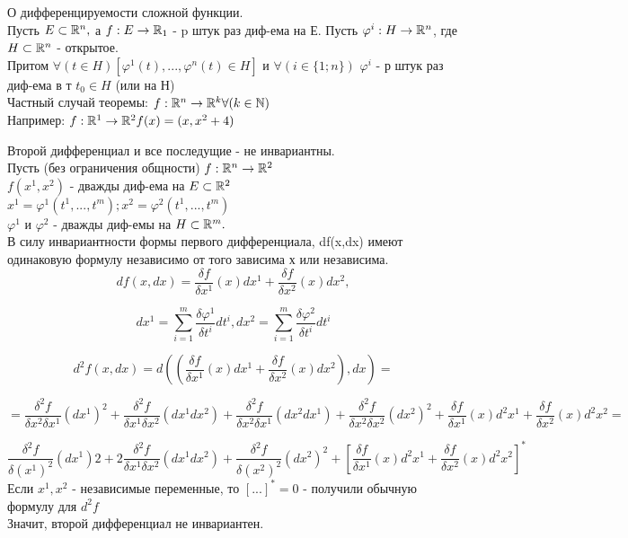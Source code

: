 \begin{teorema}
О дифференцируемости сложной функции.
\\
Пусть $E\subset\mathbb{R}^n,$ а $f:E\to\mathbb{R}_1$ - p штук раз диф-ема на Е. Пусть $\varphi^i:H\to\mathbb{R}^n$, где $H\subset\mathbb{R}^n$ - открытое.
\\
Притом $\forall(t\in H)[\varphi^1(t),...,\varphi^n(t)\in H]$ и $\forall(i\in\{1;n\})$ $\varphi^i$ - р штук раз диф-ема в т $t_0\in H$ (или на Н)
\\
Частный случай теоремы: $f:\mathbb{R}^n\to\mathbb{R}^k \forall(k\in\mathbb{N})$
\\
Например: $f:\mathbb{R}^1\to\mathbb{R}^2  f(x)=(x,x^2+4)$
\end{teorema}
\dokvo
Второй дифференциал и все последущие - не инвариантны.
\\
Пусть (без ограничения общности) $f:\mathbb{R}^n\to\mathbb{R}^2$
\\
$f(x^1,x^2)$ - дважды диф-ема на $E\subset\mathbb{R}^2$
\\
$x^1=\varphi^1(t^1,...,t^m); x^2=\varphi^2(t^1,...,t^m)$
\\
$\varphi^1$ и $\varphi^2$ - дважды диф-емы на $H\subset\mathbb{R}^m.$
\\
В силу инвариантности формы первого дифференциала, df(x,dx) имеют одинаковую формулу независимо от того зависима х или независима.
$$
df(x,dx)=\frac{\delta f}{\delta x^1}(x)dx^1+\frac{\delta f}{\delta x^2}(x)dx^2,
$$

$$
dx^1 = \sum_{i=1}^{m}\frac{\delta\varphi^1}{\delta t^i}dt^i, dx^2 = \sum_{i=1}^{m}\frac{\delta\varphi^2}{\delta t^i}dt^i
$$

$$
d^2 f(x,dx) = d((\frac{\delta f}{\delta x^1}(x)dx^1+\frac{\delta f}{\delta x^2}(x)dx^2),dx)=
$$

$$
=\frac{\delta^2 f}{\delta x^2 \delta x^1}(dx^1)^2+\frac{\delta^2 f}{\delta x^1 \delta x^2}(dx^1 dx^2)+\frac{\delta^2 f}{\delta x^2 \delta x^1}(dx^2 dx^1)+\frac{\delta^2 f}{\delta x^2 \delta x^2}(dx^2)^2+\frac{\delta f}{\delta x^1}(x)d^2x^1+\frac{\delta f}{\delta x^2}(x)d^2x^2=
$$

$$
\frac{\delta^2 f}{\delta (x^1)^2}(dx^1)2+2\frac{\delta^2 f}{\delta x^1 \delta x^2}(dx^1 dx^2)+\frac{\delta^2 f}{\delta(x^2)^2}(dx^2)^2+[\frac{\delta f}{\delta x^1}(x)d^2 x^1 + \frac{\delta f}{\delta x^2}(x)d^2 x^2]^*
$$
Если $x^1,x^2$ - независимые переменные, то $[...]^* = 0$ - получили обычную формулу для $d^2 f$
\\
Значит, второй дифференциал не инвариантен.
\dokno



